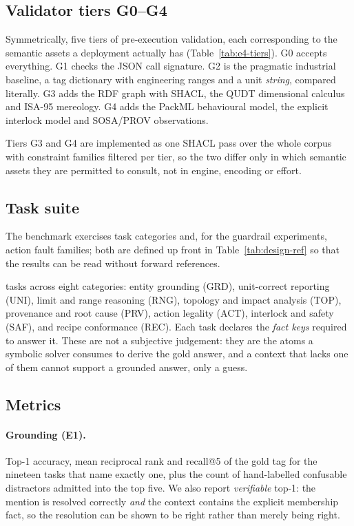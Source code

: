

\subsection{Validator tiers G0--G4}

Symmetrically, five tiers of pre-execution validation, each corresponding to the
semantic assets a deployment actually has (Table~\ref{tab:e4-tiers}). G0 accepts
everything. G1 checks the JSON call signature. G2 is the pragmatic industrial
baseline, a tag dictionary with engineering ranges and a unit \emph{string},
compared literally. G3 adds the RDF graph with SHACL, the QUDT dimensional
calculus and ISA-95 mereology. G4 adds the PackML behavioural model, the explicit
interlock model and SOSA/PROV observations.

Tiers G3 and G4 are implemented as one SHACL pass over the whole corpus with
constraint families filtered per tier, so the two differ only in which semantic
assets they are permitted to consult, not in engine, encoding or effort.

\subsection{Task suite}

The benchmark exercises \NCategories{} task categories and, for the guardrail
experiments, \NFamilies{} action fault families; both are defined up front in
Table~\ref{tab:design-ref} so that the results can be read without forward
references.



\NTasks{} tasks across eight categories: entity grounding (GRD), unit-correct
reporting (UNI), limit and range reasoning (RNG), topology and impact analysis
(TOP), provenance and root cause (PRV), action legality (ACT), interlock and
safety (SAF), and recipe conformance (REC). Each task declares the \emph{fact
keys} required to answer it. These are not a subjective judgement: they are the
atoms a symbolic solver consumes to derive the gold answer, and a context that
lacks one of them cannot support a grounded answer, only a guess.

\subsection{Metrics}
\label{sec:metrics}

\paragraph{Grounding (E1).} Top-1 accuracy, mean reciprocal rank and recall@5 of
the gold tag for the nineteen tasks that name exactly one, plus the count of
hand-labelled confusable distractors admitted into the top five. We also report
\emph{verifiable} top-1: the mention is resolved correctly \emph{and} the
context contains the explicit membership fact, so the resolution can be shown to
be right rather than merely being right.

